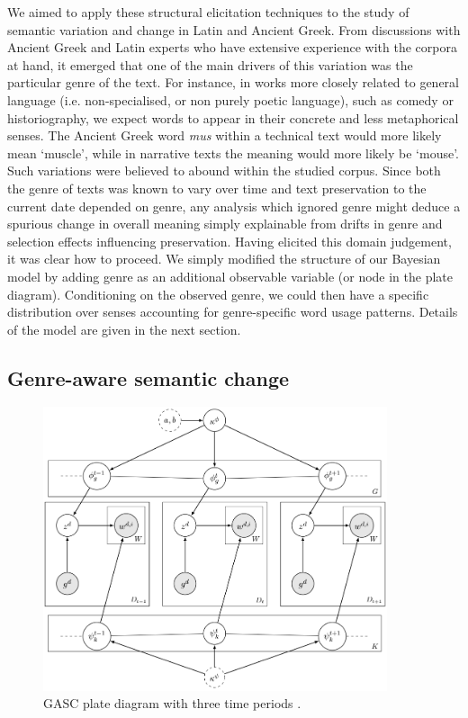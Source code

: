 \documentclass[output=paper%
]{langscibook}
\begin{document}
We aimed to apply these structural elicitation techniques to the study of semantic variation and change in Latin and Ancient Greek. From discussions with Ancient Greek and Latin experts who have extensive experience with the corpora at hand, it emerged that one of the main drivers of this variation was the particular genre of the text. For instance, in works more closely related to general language (i.e. non-specialised, or non purely poetic language), such as comedy or historiography, we expect words to appear in their concrete and less metaphorical senses. The Ancient Greek word \emph{mus} within a technical text would more likely mean `muscle', while in narrative texts the meaning would more likely be `mouse'. Such variations were believed to abound within the studied corpus. Since both the genre of texts was known to vary over time and text preservation to the current date depended on genre, any analysis which ignored genre might deduce a spurious change in overall meaning simply explainable from drifts in genre and selection effects influencing preservation. Having elicited this domain judgement, it was clear how to proceed. We simply modified the structure of our Bayesian model by adding genre as an additional observable variable (or node in
the plate diagram). Conditioning on the observed genre, we could then have a specific distribution over senses accounting for genre-specific word usage patterns. Details of the model are given in the next section. 


\subsection{Genre-aware semantic change}\label{sec:model}

\begin{figure}
\includegraphics[width=0.9\textwidth]{figures/PERRONE_plate_diagram.png}
\caption{GASC plate diagram with three time periods \citep{perrone-etal-2019-gasc}.}
\label{diagram}
\end{figure}
\end{document}
